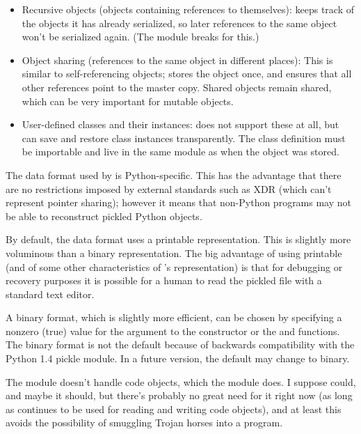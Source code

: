 \begin{itemize}

\item Recursive objects (objects containing references to themselves): 
       keeps track of the objects it has already
      serialized, so later references to the same object won't be
      serialized again.  (The  module breaks for
      this.)

\item Object sharing (references to the same object in different
      places):  This is similar to self-referencing objects;
       stores the object once, and ensures that all
      other references point to the master copy.  Shared objects
      remain shared, which can be very important for mutable objects.

\item User-defined classes and their instances:  
      does not support these at all, but  can save
      and restore class instances transparently.  The class definition 
      must be importable and live in the same module as when the
      object was stored.

\end{itemize}

The data format used by  is Python-specific.  This has
the advantage that there are no restrictions imposed by external
standards such as
XDR (which can't
represent pointer sharing); however it means that non-Python programs
may not be able to reconstruct pickled Python objects.

By default, the  data format uses a printable \ASCII{}
representation.  This is slightly more voluminous than a binary
representation.  The big advantage of using printable \ASCII{} (and of
some other characteristics of 's representation) is that
for debugging or recovery purposes it is possible for a human to read
the pickled file with a standard text editor.

A binary format, which is slightly more efficient, can be chosen by
specifying a nonzero (true) value for the  argument to the
 constructor or the  and 
functions.  The binary format is not the default because of backwards
compatibility with the Python 1.4 pickle module.  In a future version,
the default may change to binary.

The  module doesn't handle code objects, which the
 module does.  I suppose
 could, and maybe it should, but there's probably no
great need for it right now (as long as  continues
to be used for reading and writing code objects), and at least this
avoids the possibility of smuggling Trojan horses into a program.

